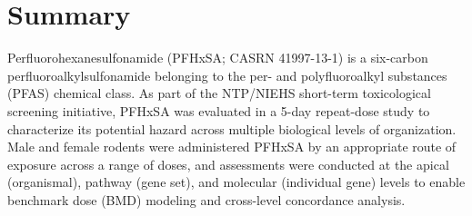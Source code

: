 
\section{Summary}

Perfluorohexanesulfonamide (PFHxSA; CASRN 41997-13-1) is a six-carbon perfluoroalkylsulfonamide belonging to the per- and polyfluoroalkyl substances (PFAS) chemical class. As part of the NTP/NIEHS short-term toxicological screening initiative, PFHxSA was evaluated in a 5-day repeat-dose study to characterize its potential hazard across multiple biological levels of organization. Male and female rodents were administered PFHxSA by an appropriate route of exposure across a range of doses, and assessments were conducted at the apical (organismal), pathway (gene set), and molecular (individual gene) levels to enable benchmark dose (BMD) modeling and cross-level concordance analysis.

